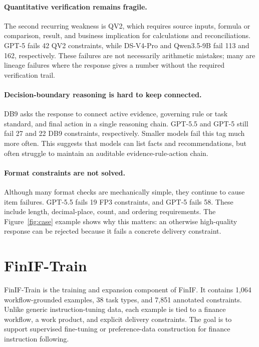\documentclass[11pt]{article}
\begin{document}
\paragraph{Quantitative verification remains fragile.}
The second recurring weakness is QV2, which requires source inputs, formula or comparison, result, and business implication for calculations and reconciliations. GPT-5 fails 42 QV2 constraints, while DS-V4-Pro and Qwen3.5-9B fail 113 and 162, respectively. These failures are not necessarily arithmetic mistakes; many are lineage failures where the response gives a number without the required verification trail.

\paragraph{Decision-boundary reasoning is hard to keep connected.}
DB9 asks the response to connect active evidence, governing rule or task standard, and final action in a single reasoning chain. GPT-5.5 and GPT-5 still fail 27 and 22 DB9 constraints, respectively. Smaller models fail this tag much more often. This suggests that models can list facts and recommendations, but often struggle to maintain an auditable evidence-rule-action chain.

\paragraph{Format constraints are not solved.}
Although many format checks are mechanically simple, they continue to cause item failures. GPT-5.5 fails 19 FP3 constraints, and GPT-5 fails 58. These include length, decimal-place, count, and ordering requirements. The Figure~\ref{fig:case} example shows why this matters: an otherwise high-quality response can be rejected because it fails a concrete delivery constraint.

\section{FinIF-Train}

FinIF-Train is the training and expansion component of FinIF. It contains 1,064 workflow-grounded examples, 38 task types, and 7,851 annotated constraints. Unlike generic instruction-tuning data, each example is tied to a finance workflow, a work product, and explicit delivery constraints. The goal is to support supervised fine-tuning or preference-data construction for finance instruction following.
\end{document}
